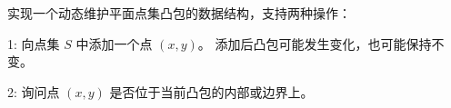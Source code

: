 实现一个动态维护平面点集凸包的数据结构，支持两种操作：

1: 向点集 $S$ 中添加一个点 $(x,y)$。  
  添加后凸包可能发生变化，也可能保持不变。

2: 询问点 $(x,y)$ 是否位于当前凸包的内部或边界上。